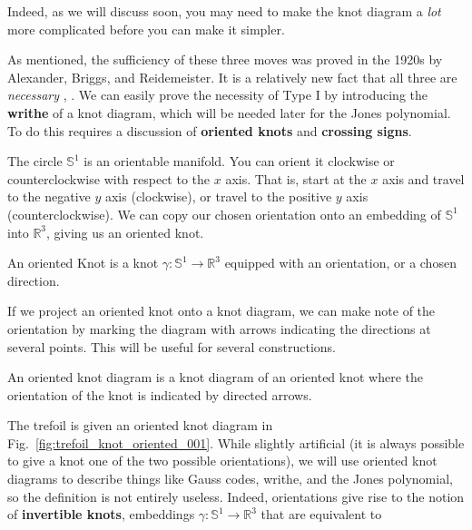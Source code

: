     Indeed, as we will discuss soon, you may need to make the knot diagram
    a \textit{lot} more complicated before you can make it simpler.
    \par\hfill\par
    As mentioned, the sufficiency of these three moves was proved in the 1920s
    by Alexander, Briggs, and Reidemeister. It is a relatively new fact that
    all three are \textit{necessary}
    \cite{OstlundReidemeisterMoves2001},
    \cite{HaggeReidemeisterRequired2005}. We can easily prove the necessity of
    Type I by introducing the \textbf{writhe} of a knot diagram, which
    will be needed later for the Jones polynomial. To do this requires a
    discussion of \textbf{oriented knots} and \textbf{crossing signs}.
    \par\hfill\par
    The circle $\mathbb{S}^{1}$ is an orientable manifold. You can orient it
    clockwise or counterclockwise with respect to the $x$ axis. That is,
    start at the $x$ axis and travel to the negative $y$ axis
    (clockwise), or travel to the positive $y$ axis (counterclockwise).
    We can copy our chosen orientation onto an embedding of
    $\mathbb{S}^{1}$ into $\mathbb{R}^{3}$, giving us an oriented knot.
    \begin{definition}
        An oriented Knot is a knot
        $\gamma:\mathbb{S}^{1}\rightarrow\mathbb{R}^{3}$ equipped with an
        orientation, or a chosen direction.
    \end{definition}
    If we project an oriented knot onto a knot diagram, we can make note of the
    orientation by marking the diagram with arrows indicating the directions
    at several points. This will be useful for several constructions.
    \begin{definition}
        An oriented knot diagram is a knot diagram of an oriented knot where
        the orientation of the knot is indicated by directed arrows.
    \end{definition}
    The trefoil is given an oriented knot diagram in
    Fig.~\ref{fig:trefoil_knot_oriented_001}. While slightly artificial (it is
    always possible to give a knot one of the two possible orientations), we
    will use oriented knot diagrams to describe things like Gauss codes,
    writhe, and the Jones polynomial, so the definition is not entirely
    useless. Indeed, orientations give rise to the notion of
    \textbf{invertible knots}, embeddings
    $\gamma:\mathbb{S}^{1}\rightarrow\mathbb{R}^{3}$ that are equivalent to
